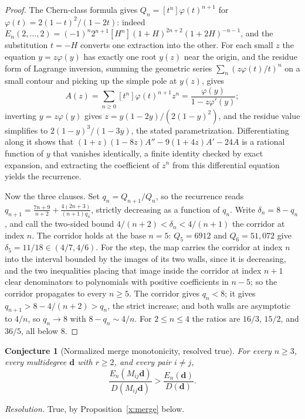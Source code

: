 \documentclass[11pt]{article}
\newtheorem{conjecture}{Conjecture}
\theoremstyle{definition}
\begin{document}
\begin{proof}
The Chern-class formula gives $Q_n=[t^n]\varphi(t)^{n+1}$ for $\varphi(t)=2(1-t)^2/(1-2t)$: indeed $E_n(2,\ldots,2)=(-1)^n2^{n+1}[H^n](1+H)^{2n+2}(1+2H)^{-n-1}$, and the substitution $t=-H$ converts one extraction into the other.  For each small $z$ the equation $y=z\varphi(y)$ has exactly one root $y(z)$ near the origin, and the residue form of Lagrange inversion, summing the geometric series $\sum_n(z\varphi(t)/t)^n$ on a small contour and picking up the simple pole at $y(z)$, gives
\[
A(z)=\sum_{n\ge0}[t^n]\varphi(t)^{n+1}z^n=\frac{\varphi(y)}{1-z\varphi'(y)};
\]
inverting $y=z\varphi(y)$ gives $z=y(1-2y)/(2(1-y)^2)$, and the residue value simplifies to $2(1-y)^3/(1-3y)$, the stated parametrization.  Differentiating along it shows that $(1+z)(1-8z)A''-9(1+4z)A'-24A$ is a rational function of $y$ that vanishes identically, a finite identity checked by exact expansion, and extracting the coefficient of $z^n$ from this differential equation yields the recurrence.

Now the three clauses.  Set $q_n=Q_{n+1}/Q_n$, so the recurrence reads $q_{n+1}=\tfrac{7n+9}{n+2}+\tfrac{4(2n+3)}{(n+1)q_n}$, strictly decreasing as a function of $q_n$.  Write $\delta_n=8-q_n$, and call the two-sided bound $4/(n+2)<\delta_n<4/(n+1)$ the corridor at index $n$.  The corridor holds at the base $n=5$: $Q_5=6912$ and $Q_6=51{,}072$ give $\delta_5=11/18\in(4/7,4/6)$.  For the step, the map carries the corridor at index $n$ into the interval bounded by the images of its two walls, since it is decreasing, and the two inequalities placing that image inside the corridor at index $n+1$ clear denominators to polynomials with positive coefficients in $n-5$; so the corridor propagates to every $n\ge5$.  The corridor gives $q_n<8$; it gives $q_{n+1}>8-4/(n+2)>q_n$, the strict increase; and both walls are asymptotic to $4/n$, so $q_n\to8$ with $8-q_n\sim4/n$.  For $2\le n\le4$ the ratios are $16/3$, $15/2$, and $36/5$, all below $8$.
\end{proof}

\begin{conjecture}[Normalized merge monotonicity, resolved true]\label{x2}
For every $n\ge3$, every multidegree $\mathbf d$ with $r\ge2$, and every pair $i\ne j$,
\[
\frac{E_n(M_{ij}\mathbf d)}{D(M_{ij}\mathbf d)}>\frac{E_n(\mathbf d)}{D(\mathbf d)}.
\]
\end{conjecture}

\emph{Resolution.} True, by Proposition~\ref{x:merge} below.
\end{document}
